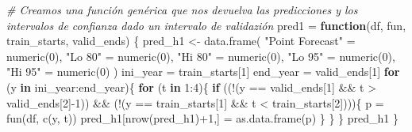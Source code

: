 \documentclass[
]{article}
\newenvironment{Shaded}{\begin{snugshade}}{\end{snugshade}}
\newcommand{\CommentTok}[1]{\textcolor[rgb]{0.56,0.35,0.01}{\textit{#1}}}
\newcommand{\ControlFlowTok}[1]{\textcolor[rgb]{0.13,0.29,0.53}{\textbf{#1}}}
\newcommand{\DecValTok}[1]{\textcolor[rgb]{0.00,0.00,0.81}{#1}}
\newcommand{\FunctionTok}[1]{\textcolor[rgb]{0.00,0.00,0.00}{#1}}
\newcommand{\NormalTok}[1]{#1}
\newcommand{\OtherTok}[1]{\textcolor[rgb]{0.56,0.35,0.01}{#1}}
\newcommand{\SpecialCharTok}[1]{\textcolor[rgb]{0.00,0.00,0.00}{#1}}
\newcommand{\StringTok}[1]{\textcolor[rgb]{0.31,0.60,0.02}{#1}}
\begin{document}
\begin{Shaded}
\begin{Highlighting}[]
\CommentTok{\# Creamos una función genérica que nos devuelva las predicciones y los intervalos de confianza dado un intervalo de validazión}
\NormalTok{pred1 }\OtherTok{=} \ControlFlowTok{function}\NormalTok{(df, fun, train\_starts, valid\_ends) \{}
\NormalTok{  pred\_h1 }\OtherTok{\textless{}{-}} \FunctionTok{data.frame}\NormalTok{(}
    \StringTok{"Point Forecast"} \OtherTok{=} \FunctionTok{numeric}\NormalTok{(}\DecValTok{0}\NormalTok{),}
    \StringTok{"Lo 80"} \OtherTok{=} \FunctionTok{numeric}\NormalTok{(}\DecValTok{0}\NormalTok{),}
    \StringTok{"Hi 80"} \OtherTok{=} \FunctionTok{numeric}\NormalTok{(}\DecValTok{0}\NormalTok{),}
    \StringTok{"Lo 95"} \OtherTok{=} \FunctionTok{numeric}\NormalTok{(}\DecValTok{0}\NormalTok{),}
    \StringTok{"Hi 95"} \OtherTok{=} \FunctionTok{numeric}\NormalTok{(}\DecValTok{0}\NormalTok{)}
\NormalTok{  )}
\NormalTok{  ini\_year }\OtherTok{=}\NormalTok{ train\_starts[}\DecValTok{1}\NormalTok{]}
\NormalTok{  end\_year }\OtherTok{=}\NormalTok{ valid\_ends[}\DecValTok{1}\NormalTok{]}
  \ControlFlowTok{for}\NormalTok{ (y }\ControlFlowTok{in}\NormalTok{ ini\_year}\SpecialCharTok{:}\NormalTok{end\_year)\{}
    \ControlFlowTok{for}\NormalTok{ (t }\ControlFlowTok{in} \DecValTok{1}\SpecialCharTok{:}\DecValTok{4}\NormalTok{)\{}
      \ControlFlowTok{if}\NormalTok{ ((}\SpecialCharTok{!}\NormalTok{(y }\SpecialCharTok{==}\NormalTok{ valid\_ends[}\DecValTok{1}\NormalTok{] }\SpecialCharTok{\&\&}\NormalTok{ t }\SpecialCharTok{\textgreater{}}\NormalTok{ valid\_ends[}\DecValTok{2}\NormalTok{]}\SpecialCharTok{{-}}\DecValTok{1}\NormalTok{)) }\SpecialCharTok{\&\&}
\NormalTok{           (}\SpecialCharTok{!}\NormalTok{(y }\SpecialCharTok{==}\NormalTok{ train\_starts[}\DecValTok{1}\NormalTok{] }\SpecialCharTok{\&\&}\NormalTok{ t }\SpecialCharTok{\textless{}}\NormalTok{ train\_starts[}\DecValTok{2}\NormalTok{])))\{}
\NormalTok{        p }\OtherTok{=} \FunctionTok{fun}\NormalTok{(df, }\FunctionTok{c}\NormalTok{(y, t))}
\NormalTok{        pred\_h1[}\FunctionTok{nrow}\NormalTok{(pred\_h1)}\SpecialCharTok{+}\DecValTok{1}\NormalTok{,] }\OtherTok{=} \FunctionTok{as.data.frame}\NormalTok{(p)}
\NormalTok{        \}}
\NormalTok{     \}}
\NormalTok{  \}}
\NormalTok{  pred\_h1}
\NormalTok{\}}
\end{Highlighting}
\end{Shaded}
\end{document}
